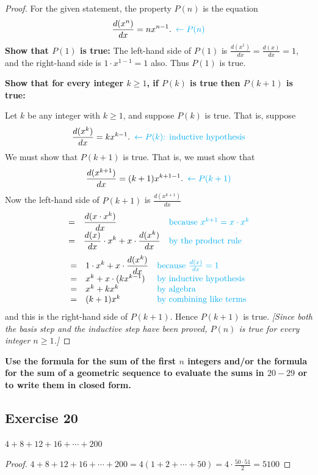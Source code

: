 \documentclass[14pt]{extarticle}
\newcommand{\dps}{\displaystyle}
\newcommand{\from}{\leftarrow}
\newcommand{\cy}{\color{cyan}}
\begin{document}
\begin{proof}
For the given statement, the property $P(n)$ is the equation
\[
\dps \frac{d(x^n)}{dx} = n x^{n-1}. \,\,\, {\cy \from P(n)}
\]
{\bf Show that $P(1)$ is true:} The left-hand side of $P(1)$ is $\dps \frac{d(x^1)}{dx} = \frac{d(x)}{dx} = 1$, and the right-hand side is $1 \cdot x^{1-1} = 1$ also. Thus $P(1)$ is true.

{\bf Show that for every integer $k \geq 1$, if $P(k)$ is true then $P(k + 1)$ is true:}

Let $k$ be any integer with $k \geq 1$, and suppose $P(k)$ is true. That is, suppose
\[
\dps \frac{d(x^k)}{dx} = k x^{k-1}. \,\,\, {\cy \from P(k) \text{: inductive hypothesis}}
\]
We must show that $P(k + 1)$ is true. That is, we must show that
\[
\dps \frac{d(x^{k+1})}{dx} = (k+1) x^{k+1-1}. \,\,\,{\cy \from P(k+1)}
\]
Now the left-hand side of $P(k+1)$ is $\dps \frac{d(x^{k+1})}{dx}$
\[
\begin{array}{lll}
= & \dps \frac{d(x\cdot x^k)}{dx} & \text{\cy because $x^{k+1} = x\cdot x^k$} \\
= & \dps \frac{d(x)}{dx}\cdot x^k + x\cdot\frac{d(x^k)}{dx} & \text{\cy by the product rule}
\end{array}
\]
\[
\begin{array}{lll}
= & \dps 1 \cdot x^k + x\cdot\frac{d(x^k)}{dx} & \text{\cy because $\frac{d(x)}{dx} = 1$} \\
= & x^k + x\cdot(k x^{k-1}) & \text{\cy by inductive hypothesis} \\
= & x^k + kx^k & \text{\cy by algebra} \\
= & (k+1)x^k & \text{\cy by combining like terms}
\end{array}
\]
and this is the right-hand side of $P(k + 1)$. Hence $P(k + 1)$ is true. {\it [Since both the basis step and the inductive step have been proved, $P(n)$ is true for every integer $n \geq 1$.]}
\end{proof}

{\bf \cy Use the formula for the sum of the first $n$ integers and/or the formula for the sum of a geometric sequence to evaluate the sums in $20-29$ or to write them in closed form.}

\subsection{Exercise 20}
$4 + 8 + 12 + 16 + \cdots + 200$

\begin{proof}
$\dps 4 + 8 + 12 + 16 + \cdots + 200 = 4(1+2+\cdots+50) = 4 \cdot \frac{50 \cdot 51}{2} = 5100$
\end{proof}
\end{document}
